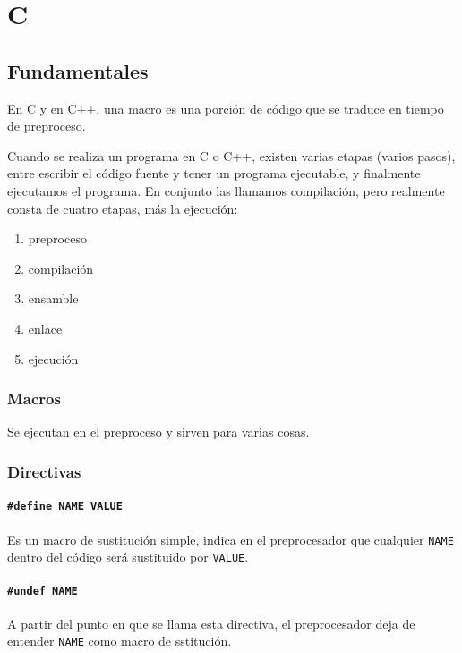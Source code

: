 \chapter*{C}

\section*{Fundamentales}

En C y en C++, una macro es una porción de código que se traduce en tiempo de preproceso.

Cuando se realiza un programa en C o C++, existen varias etapas (varios pasos), entre escribir el código fuente y tener un programa ejecutable, y finalmente ejecutamos el programa. En conjunto las llamamos compilación, pero realmente consta de cuatro etapas, más la ejecución:

\begin{enumerate}
    \item preproceso
    \item compilación
    \item ensamble
    \item enlace
    \item ejecución
\end{enumerate}

\subsection*{Macros} Se ejecutan en el preproceso y sirven para varias cosas.

\subsection*{Directivas}

\subsubsection{\texttt{\#define NAME VALUE}} 
Es un macro de sustitución simple, indica en el preprocesador que cualquier \texttt{NAME} dentro del código será sustituido por \texttt{VALUE}. 

\subsubsection{\texttt{\#undef NAME}} 
A partir del punto en que se llama esta directiva, el preprocesador deja de entender \texttt{NAME} como macro de sstitución. \\\

